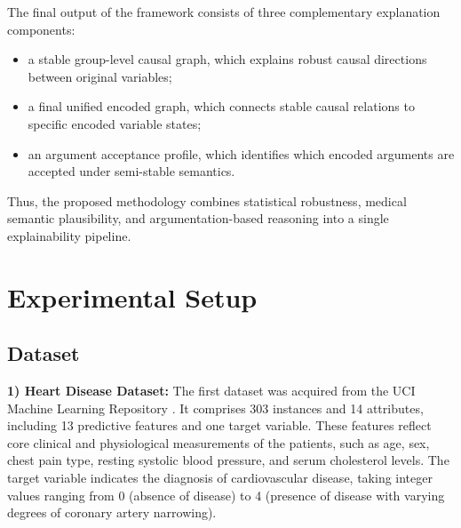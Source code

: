 \documentclass[conference, a4paper]{IEEEtran}
\begin{document}
The final output of the framework consists of three complementary explanation components:

\begin{itemize}
    \item a stable group-level causal graph, which explains robust causal directions between original variables;
    \item a final unified encoded graph, which connects stable causal relations to specific encoded variable states;
    \item an argument acceptance profile, which identifies which encoded arguments are accepted under semi-stable semantics.
\end{itemize}

Thus, the proposed methodology combines statistical robustness, medical semantic plausibility, and argumentation-based reasoning into a single explainability pipeline.

\section{Experimental Setup}
\subsection{Dataset} \label{sec:dataset}
\textbf{1) Heart Disease Dataset:} The first dataset was acquired from the UCI Machine Learning Repository \cite{janosi1988heart}. It comprises 303 instances and 14 attributes, including 13 predictive features and one target variable. These features reflect core clinical and physiological measurements of the patients, such as age, sex, chest pain type, resting systolic blood pressure, and serum cholesterol levels. The target variable indicates the diagnosis of cardiovascular disease, taking integer values ranging from 0 (absence of disease) to 4 (presence of disease with varying degrees of coronary artery narrowing).
\end{document}
